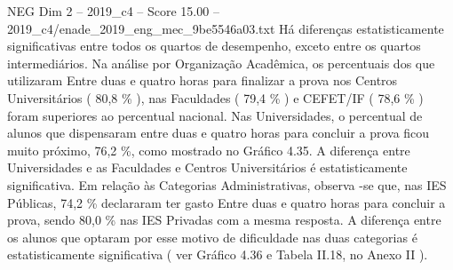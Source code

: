 \begin{textsample}{NEG Dim 2 – 2019\_c4 – Score 15.00 – 2019\_c4/enade\_2019\_eng\_mec\_9be5546a03.txt}
Há diferenças estatisticamente significativas entre todos os quartos de desempenho, exceto entre os quartos intermediários.
Na análise por Organização Acadêmica, os percentuais dos que utilizaram Entre duas e quatro horas para finalizar a prova nos Centros Universitários ( 80,8 \% ), nas Faculdades ( 79,4 \% ) e CEFET/IF ( 78,6 \% ) foram superiores ao percentual nacional.
Nas Universidades, o percentual de alunos que dispensaram entre duas e quatro horas para concluir a prova ficou muito próximo, 76,2 \%, como mostrado no Gráfico 4.35.
A diferença entre Universidades e as Faculdades e Centros Universitários é estatisticamente significativa.
Em relação às Categorias Administrativas, observa -se que, nas IES Públicas, 74,2 \% declararam ter gasto Entre duas e quatro horas para concluir a prova, sendo 80,0 \% nas IES Privadas com a mesma resposta.
A diferença entre os alunos que optaram por esse motivo de dificuldade nas duas categorias é estatisticamente significativa ( ver Gráfico 4.36 e Tabela II.18, no Anexo II ).

\end{textsample}
